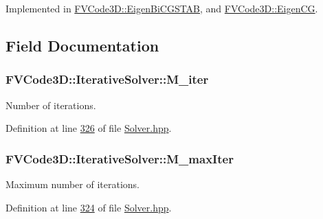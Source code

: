 Implemented in \hyperlink{classFVCode3D_1_1EigenBiCGSTAB_a8a5ab1bfdbdbb524a8b5a8b9bce8e83d}{F\+V\+Code3\+D\+::\+Eigen\+Bi\+C\+G\+S\+T\+AB}, and \hyperlink{classFVCode3D_1_1EigenCG_a83780a13ba3e3c60e6ad9b587d51ad41}{F\+V\+Code3\+D\+::\+Eigen\+CG}.



\subsection{Field Documentation}
\subsubsection[{\texorpdfstring{M\+\_\+iter}{M_iter}}]{ F\+V\+Code3\+D\+::\+Iterative\+Solver\+::\+M\+\_\+iter\hspace{0.3cm}{\ttfamily [protected]}}\hypertarget{classFVCode3D_1_1IterativeSolver_a2804dba3a051a5380aca64d9baf623ad}{}\label{classFVCode3D_1_1IterativeSolver_a2804dba3a051a5380aca64d9baf623ad}


Number of iterations. 



Definition at line \hyperlink{Solver_8hpp_source_l00326}{326} of file \hyperlink{Solver_8hpp_source}{Solver.\+hpp}.

\subsubsection[{\texorpdfstring{M\+\_\+max\+Iter}{M_maxIter}}]{ F\+V\+Code3\+D\+::\+Iterative\+Solver\+::\+M\+\_\+max\+Iter\hspace{0.3cm}{\ttfamily [protected]}}\hypertarget{classFVCode3D_1_1IterativeSolver_a063b910ea559ee5c1907a611a0aa3ef5}{}\label{classFVCode3D_1_1IterativeSolver_a063b910ea559ee5c1907a611a0aa3ef5}


Maximum number of iterations. 



Definition at line \hyperlink{Solver_8hpp_source_l00324}{324} of file \hyperlink{Solver_8hpp_source}{Solver.\+hpp}.

